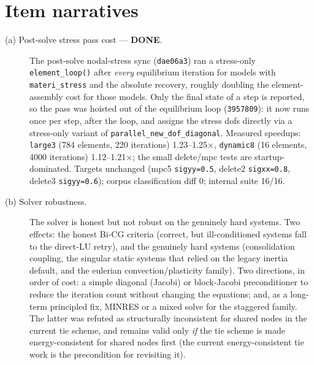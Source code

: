 \documentclass[11pt,a4paper]{report}
\newcommand{\code}[1]{\texttt{#1}}
\begin{document}
\section{Item narratives}

\begin{description}
  \item[(a) Post-solve stress pass cost --- \textbf{DONE}.] The post-solve
        nodal-stress sync (\code{dae06a3}) ran a stress-only
        \code{element\_\allowbreak loop()} after \emph{every} equilibrium iteration for
        models with \code{materi\_\allowbreak stress} and the absolute recovery, roughly
        doubling the element-assembly cost for those models. Only the final
        state of a step is reported, so the pass was hoisted out of the
        equilibrium loop (\code{3957809}): it now runs once per step, after the
        loop, and assigns the stress dofs directly via a stress-only variant of
        \code{parallel\_\allowbreak new\_\allowbreak dof\_\allowbreak diagonal}. Measured speedups:
        \code{large3} (784 elements, 220 iterations) 1.23--1.25$\times$,
        \code{dynamic8} (16 elements, 4000 iterations) 1.12--1.21$\times$; the
        small delete/mpc tests are startup-dominated. Targets unchanged
        (mpc5 \code{sigyy=0.5}, delete2 \code{sigxx=0.8}, delete3
        \code{sigyy=0.6}); corpus classification diff 0; internal suite 16/16.

  \item[(b) Solver robustness.] The solver is honest but not robust on the
        genuinely hard systems. Two effects: the honest Bi-CG criteria (correct,
        but ill-conditioned systems fall to the direct-LU retry), and the
        genuinely hard systems (consolidation coupling, the singular static
        systems that relied on the legacy inertia default, and the eulerian
        convection/plasticity family). Two directions, in order of cost: a simple
        diagonal (Jacobi) or block-Jacobi preconditioner to reduce the iteration
        count without changing the equations; and, as a long-term principled fix,
        MINRES or a mixed solve for the staggered family. The latter was refuted
        as structurally inconsistent for shared nodes in the current tie scheme,
        and remains valid only \emph{if} the tie scheme is made
        energy-consistent for shared nodes first (the current
        energy-consistent tie work is the precondition for revisiting it).


\end{description}
\end{document}
